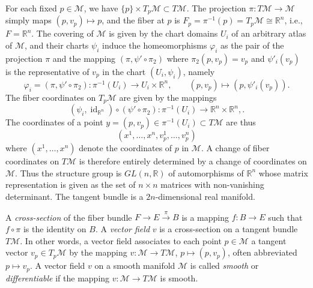 \begin{beispiel}
	\medskip
	\noindent
	For each fixed $p \in \mathscr{M}$, we have $\{p\} \times T_p \mathscr{M} \subset T\mathscr{M}$.
	The projection $\pi: T\mathscr{M} \to \mathscr{M}$ simply maps $(p, v_p) \mapsto p$, and the fiber at $p$ is $F_p = \pi^{-1}(p) = T_p \mathscr{M} \cong \mathbb{R}^n$, i.e., $F = \mathbb{R}^n$.
	The covering of $\mathscr{M}$ is given by the chart domains $U_i$ of an arbitrary atlas of $\mathscr{M}$, and their charts $\psi_i$ induce the homeomorphisms $\varphi_i$ as the pair of the projection $\pi$ and the mapping $(\pi, \psi' \circ \pi_2)$ where $\pi_2(p, v_p) = v_p$ and $\psi'_i(v_p)$ is the representative of $v_p$ in the chart $(U_i, \psi_i)$, namely
	\begin{equation}
		\varphi_i = (\pi, \psi' \circ \pi_2) : \pi^{-1}(U_i) \to U_i \times \mathbb{R}^n,
		\qquad
		(p, v_p) \mapsto (p, \psi'_i(v_p))
		.
	\end{equation}
	The fiber coordinates on $T_p \mathscr{M}$ are given by the mappings
	\begin{equation}
		(\psi_i, \operatorname{id}_{\mathbb{R}^n})
		\circ (\psi' \circ \pi_2) : \pi^{-1}(U_i) \to \mathbb{R}^n \times \mathbb{R}^n,
		.
	\end{equation}
	The coordinates of a point $y = (p, v_p) \in \pi^{-1}(U_i) \subset T\mathscr{M}$ are thus
	\begin{equation}
		(x^1, \ldots, x^n, v_p^1, \ldots, v_p^n)
	\end{equation}
	where $(x^1, \ldots, x^n)$ denote the coordinates of $p$ in $\mathscr{M}$.
	A change of fiber  coordinates on $T\mathscr{M}$ is therefore entirely determined by a change of coordinates on $\mathscr{M}$.
	Thus the structure group is $GL(n, \mathbb{R})$ of automorphisms of $\mathbb{R}^n$ whose matrix representation is given as the set of $n \times n$ matrices with non-vanishing determinant.
	The tangent bundle is a $2n$-dimensional real manifold. \cite[584]{Teubner-Taschenbuch-2}
\end{beispiel}

\begin{definition}
	A \emph{cross-section} of the fiber bundle
	$F \to E \stackrel{\pi}{\to} B$ is a mapping $f: B \to E$ such that $f \circ \pi$ is the identity on $B$.
	A \emph{vector field} $v$ is a cross-section on a tangent bundle $T\mathscr{M}$. In other words, a vector field associates to each point $p \in \mathscr{M}$ a tangent vector $v_p \in T_p \mathscr{M}$ by the mapping $v: \mathscr{M} \to T\mathscr{M}$, $p \mapsto (p, v_p)$, often abbreviated $p \mapsto v_p$.
	A vector field $v$ on a smooth manifold $\mathscr{M}$ is called \emph{smooth} or \emph{differentiable} if the mapping $v: \mathscr{M} \to T\mathscr{M}$ is smooth.
	\cite[132]{Choquet-Bruhat-et-al-1982}
\end{definition}

